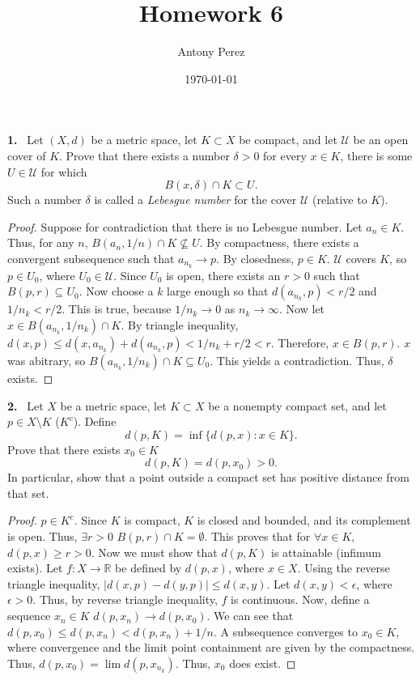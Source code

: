 \documentclass[12pt]{amsart}
\title{Homework 6}
\author{Antony Perez}
\date{\today}
\newcommand{\R}{\mathbb{R}}
\newcommand{\st}{\text{such that }}
\theoremstyle{plain}
\theoremstyle{definition}
\theoremstyle{remark}
\newenvironment{problem}[1]{\par\medskip\noindent\textbf{#1.}\ }{\par\smallskip}
\begin{document}
\maketitle

\begin{problem}{1}
Let $(X,d)$ be a metric space, let $K \subset X$ be compact, and let $\mathcal{U}$ be an open cover of $K$. Prove that there exists a number $\delta > 0$ \st for every $x \in K$, there is some $U \in \mathcal{U}$ for which 
\[
B(x,\delta)\cap K \subset U.
\] 
Such a number $\delta$ is called a \textit{Lebesgue number} for the cover $\mathcal{U}$ (relative to $K$).
\end{problem}

\begin{proof}
    Suppose for contradiction that there is no Lebesgue number. Let $a_n \in K$. Thus, for any $n$, $B(a_n,1/n)\cap K \not \subseteq U.$ By compactness, there exists a convergent subsequence such that $a_{n_k} \to p$. By closedness, $p \in K$. $\mathcal{U}$ covers $K$, so $p \in U_0$, where $U_0 \in \mathcal{U}$. Since $U_0$ is open, there exists an $r>0$ such that $B(p,r) \subseteq U_0$. Now choose a $k$ large enough so that $d(a_{n_k}, p) < r/2$ and $1/n_k < r/2$. This is true, because $1/n_k \to 0$ as $n_k \to \infty$. Now let $x \in B(a_{n_k},1/n_k)\cap K$. By triangle inequality, $d(x,p) \le d(x,a_{n_k}) + d(a_{n_k},p) < 1/n_k + r/2 < r$. Therefore, $x \in B(p,r)$. $x$ was abitrary, so $B(a_{n_k},1/n_k) \cap K \subseteq U_0$. This yields a contradiction. Thus, $\delta$ exists. 
\end{proof}

\begin{problem}{2}
Let $X$ be a metric space, let $K \subset X$ be a nonempty compact set, and let $p \in X \setminus K $ ($K^c$). Define 
\[
d(p,K) = \inf\{d(p,x):x \in K\}.
\]
Prove that there exists $x_0 \in K$ \st 
\[
d(p,K) = d(p,x_0) > 0.
\]
In particular, show that a point outside a compact set has positive distance from that set. 
\end{problem}

\begin{proof}
    $p \in K^c$. Since $K$ is compact, $K$ is closed and bounded, and its complement is open. Thus, $\exists r > 0$ \st $B(p,r) \cap K = \emptyset$. This proves that for $\forall x\in K,$ $d(p,x) \ge r > 0$. Now we must show that $d(p,K)$ is attainable (infimum exists). Let $f:X \to \R$ be defined by $d(p,x)$, where $x \in X$. Using the reverse triangle inequality, $|d(x,p)-d(y,p)| \le d(x,y)$. Let $d(x,y) < \epsilon$, where $\epsilon > 0$. Thus, by reverse triangle inequality, $f$ is continuous. Now, define a sequence $x_n \in K$ \st $d(p,x_n) \to d(p,x_0)$. We can see that $d(p,x_0) \le d(p,x_n) < d(p,x_n) + 1/n$. A subsequence converges to $x_0 \in K$, where convergence and the limit point containment are given by the compactness. Thus, $d(p,x_0) = \lim d(p,x_{n_k})$. Thus, $x_0$ does exist. 
\end{proof}
\end{document}
